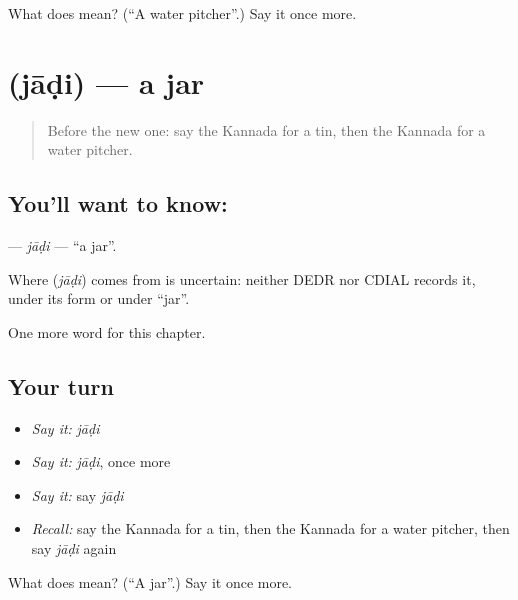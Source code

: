 \begin{tcolorbox}[breakable,colback=teal!4,colframe=teal!35!black,title={Before you move on}]
What does  mean? (\textquotedblleft{}A water pitcher\textquotedblright{}.) Say it once more.
\end{tcolorbox}
\section[\texorpdfstring{\kn{ಜಾಡಿ} (jāḍi)}{ಜಾಡಿ (jāḍi)}]{ (jāḍi) — a jar}

\label{lesson:KA-C265-jadi}



\begin{quote}
Before the new one: say the Kannada for a tin, then the Kannada for a water pitcher.
\end{quote}

\subsection*{You'll want to know: }
\textbf{} — \emph{jāḍi} — \textquotedblleft{}a jar\textquotedblright{}.

\begin{cousinweb}
Where \textbf{} (\emph{jāḍi}) comes from is uncertain: neither DEDR nor CDIAL records it, under its form or under \textquotedblleft{}jar\textquotedblright{}.
\end{cousinweb}

\begin{grammarlens}[title={What you've built}]
One more word for this chapter.
\end{grammarlens}

\subsection*{Your turn}
\begin{itemize}
\raggedright
  \item \emph{Say it:} \emph{jāḍi}
  \item \emph{Say it:} \emph{jāḍi}, once more
  \item \emph{Say it:} say \emph{jāḍi}
  \item \emph{Recall:} say the Kannada for a tin, then the Kannada for a water pitcher, then say \emph{jāḍi} again
\end{itemize}

\begin{tcolorbox}[breakable,colback=teal!4,colframe=teal!35!black,title={Before you move on}]
What does  mean? (\textquotedblleft{}A jar\textquotedblright{}.) Say it once more.
\end{tcolorbox}
